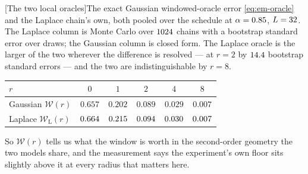 \begin{center}
\begin{minipage}{\linewidth}\small\centering
{}[The two local oracles]{The exact Gaussian windowed-oracle
error \eqref{eq:em-oracle} and the Laplace chain's own, both pooled over the
schedule at $\alpha = 0.85$, $L = 32$. The Laplace column is Monte Carlo
over $1024$ chains with a bootstrap standard error over draws; the
Gaussian column is closed form. The Laplace oracle is the larger of the two
wherever the difference is resolved --- at $r = 2$ by
$14.4$ bootstrap standard errors --- and the two are
indistinguishable by $r = 8$.}
\label{tab:em-oracle-laplace}
\begin{tabular}{@{}lccccc@{}}
\toprule
$r$ & $0$ & $1$ & $2$ & $4$ & $8$ \\
\midrule
Gaussian $\mathcal{W}(r)$ & $0.657$ & $0.202$ & $0.089$ & $0.029$ & $0.007$ \\
Laplace $\mathcal{W}_{\mathrm{L}}(r)$
  & $0.664$ & $0.215$ & $0.094$
  & $0.030$ & $0.007$ \\
\bottomrule
\end{tabular}
\end{minipage}
\end{center}

\noindent
So $\mathcal{W}(r)$ tells us what the window is worth in the second-order
geometry the two models share, and the measurement says the experiment's own
floor sits slightly above it at every radius that matters here.

